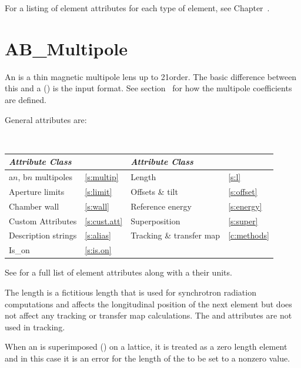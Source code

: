 For a listing of element attributes for each type of element, see Chapter~.

\newpage

\section{AB_Multipole}
\label{s:ab.m}

An  is a thin magnetic multipole lens up to 21\St order. The basic difference
between this and a  () is the input format. See
section~ for how the multipole coefficients are defined.

General  attributes are:
\begin{center}
\tt
\begin{tabular}{llll} \toprule
  {\sl Attribute Class}      & \s               & {\sl Attribute Class}      & \s              \\ \midrule
  a$n$, b$n$ multipoles      & \ref{s:multip}   & Length                     & \ref{s:l}       \\
  Aperture limits            & \ref{s:limit}    & Offsets \& tilt            & \ref{s:offset}  \\
  Chamber wall               & \ref{s:wall}     & Reference energy           & \ref{s:energy}  \\ 
  Custom Attributes          & \ref{s:cust.att} & Superposition              & \ref{s:super}   \\
  Description strings        & \ref{s:alias}    & Tracking \& transfer map   & \ref{c:methods} \\
  Is_on                      & \ref{s:is.on}    &                            &                 \\
  \bottomrule
\end{tabular}
\end{center}
\toffset
See  for a full list of element attributes along with a their units.

The length  is a fictitious length that is used for synchrotron radiation computations and
affects the longitudinal position of the next element but does not affect any tracking or transfer
map calculations.  The  and  attributes are not used in tracking.

When an  is superimposed () on a lattice, it is treated as a zero
length element and in this case it is an error for the length of the  to be set to
a nonzero value.


